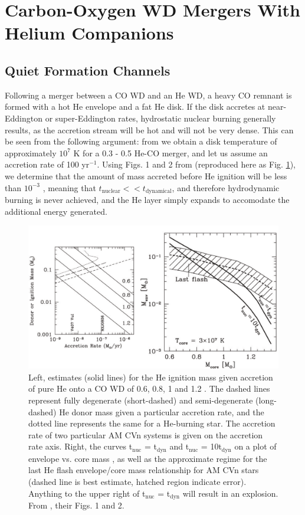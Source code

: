 \section{Carbon-Oxygen WD Mergers With Helium Companions}
\label{sec:withhecompanions}

\subsection{Quiet Formation Channels}

Following a merger between a CO WD and an He WD, a heavy CO remnant is formed with a hot He envelope and a fat He disk.  If the disk accretes at near-Eddington or super-Eddington rates, hydrostatic nuclear burning generally results, as the accretion stream will be hot and will not be very dense.  This can be seen from the following argument: from \cite{loreig09} we obtain a disk temperature of approximately $10^7$ K for a 0.3 - 0.5 {\Msun} He-CO merger, and let us assume an accretion rate of 100 {\Msun} yr$^{-1}$.  Using Figs. 1 and 2 from \cite{bild+07} (reproduced here as Fig. \ref{bildstenfig}), we determine that the amount of mass accreted before He ignition will be less than $10^{-3}$ {\Msun}, meaning that $t_{\mathrm{nuclear}} << t_{\mathrm{dynamical}}$, and therefore hydrodynamic burning is never achieved, and the He layer simply expands to accomodate the additional energy generated.

\begin{figure}
\centerline{\includegraphics[width=1.0\hsize]{bildstenfig.pdf}}
\caption{Left, estimates (solid lines) for the He ignition mass given accretion of pure He onto a CO WD of 0.6, 0.8, 1 and 1.2 {\Msun}.  The dashed lines represent fully degenerate (short-dashed) and semi-degenerate (long-dashed) He donor mass given a particular accretion rate, and the dotted line represents the same for a He-burning star.  The accretion rate of two particular AM CVn systems is given on the accretion rate axis.  Right, the curves t$_{\mathrm{nuc}}$  = t$_{\mathrm{dyn}}$ and t$_{\mathrm{nuc}}$  = 10t$_{\mathrm{dyn}}$ on a plot of envelope vs. core mass , as well as the approximate regime for the last He flash envelope/core mass relationship for AM CVn stars (dashed line is best estimate, hatched region indicate error).  Anything to the upper right of t$_{\mathrm{nuc}}$  = t$_{\mathrm{dyn}}$ will result in an explosion.  From \cite{bild+07}, their Figs. 1 and 2.}
\label{bildstenfig}
\end{figure}

